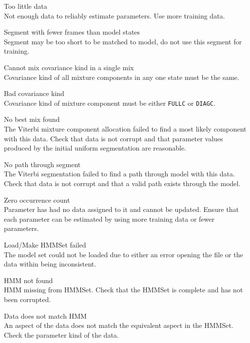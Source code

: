 \begin{itemize}
\begin{itemize}
    Too little data\\
        Not enough data to reliably estimate parameters.  Use more 
        training data.

    Segment with fewer frames than model states\\
        Segment may be too short to be matched to model, do not use
        this segment for training.

    Cannot mix covariance kind in a single mix\\
        Covariance kind of all mixture components in any one state must be
        the same.

    Bad covariance kind\\
        Covariance kind of mixture component must be either
        \texttt{FULLC} or \texttt{DIAGC}.

    No best mix found\\
        The Viterbi mixture component allocation failed to find a most likely
        component with this data.  Check that data is not corrupt and
        that parameter values produced by the initial uniform segmentation
        are reasonable.

    No path through segment\\
        The Viterbi segmentation failed to find a path through
        model with this data.  Check that data is not corrupt and that
        a valid path exists through the model.

    Zero occurrence count\\
        Parameter has had no data assigned to it and cannot be
        updated.  Ensure that each parameter can be estimated by
        using more training data or fewer parameters.

    Load/Make HMMSet failed\\
        The model set could not be loaded due to either an error opening the
        file or the data within being inconsistent.

    HMM not found\\
        HMM missing from HMMSet.  Check that the HMMSet is complete and 
        has not been corrupted.

    Data does not match HMM\\
        An aspect of the data does not match the equivalent aspect in 
        the HMMSet.  Check the parameter kind of the data.


\end{itemize}
\end{itemize}
